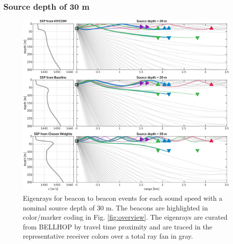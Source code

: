 \subsubsection{Source depth of 30 m}
\begin{figure}[ht!]
  \centering
  \includegraphics[width=\reprintcolumnwidth]{figs/raytrace-3env-zs-30.pdf}
  \caption{Eigenrays for beacon to beacon events for each sound speed with a nominal source depth of 30 m. The beacons are highlighted in color/marker coding in Fig. \ref{fig:overview}. The eigenrays are curated from BELLHOP by travel time proximity and are traced in the representative receiver colors over a total ray fan in gray.}
  \label{fig:raytrace-zs30}
\end{figure}

